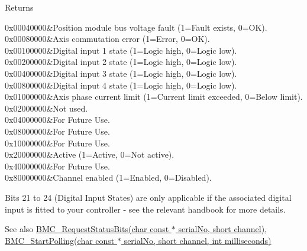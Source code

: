 \begin{DoxyReturn}{Returns}
\begin{longtabu}
0x00040000&Position module bus voltage fault (1=Fault exists, 0=OK). \\
0x00080000&Axis commutation error (1=Error, 0=OK). \\
0x00100000&Digital input 1 state (1=Logic high, 0=Logic low). \\
0x00200000&Digital input 2 state (1=Logic high, 0=Logic low). \\
0x00400000&Digital input 3 state (1=Logic high, 0=Logic low). \\
0x00800000&Digital input 4 state (1=Logic high, 0=Logic low). \\
0x01000000&Axis phase current limit (1=Current limit exceeded, 0=Below limit). \\
0x02000000&Not used. \\
0x04000000&For Future Use. \\
0x08000000&For Future Use. \\
0x10000000&For Future Use. \\
0x20000000&Active (1=Active, 0=Not active). \\
0x40000000&For Future Use. \\
0x80000000&Channel enabled (1=Enabled, 0=Disabled). \\
\end{longtabu}


Bits 21 to 24 (Digital Input States) are only applicable if the associated digital input is fitted to your controller -\/ see the relevant handbook for more details. 
\end{DoxyReturn}


\begin{DoxySeeAlso}{See also}
\hyperlink{group___benchtop_brushless_motor_ga258ef3cbfe9b808c979f1c65d464bcc6}{B\+M\+C\+\_\+\+Request\+Status\+Bits(char const $\ast$ serial\+No, short channel)}, \hyperlink{group___benchtop_brushless_motor_ga5555f5b1d2e3d8d457ddc1513916d343}{B\+M\+C\+\_\+\+Start\+Polling(char const $\ast$ serial\+No, short channel, int milliseconds)}


\end{DoxySeeAlso}
